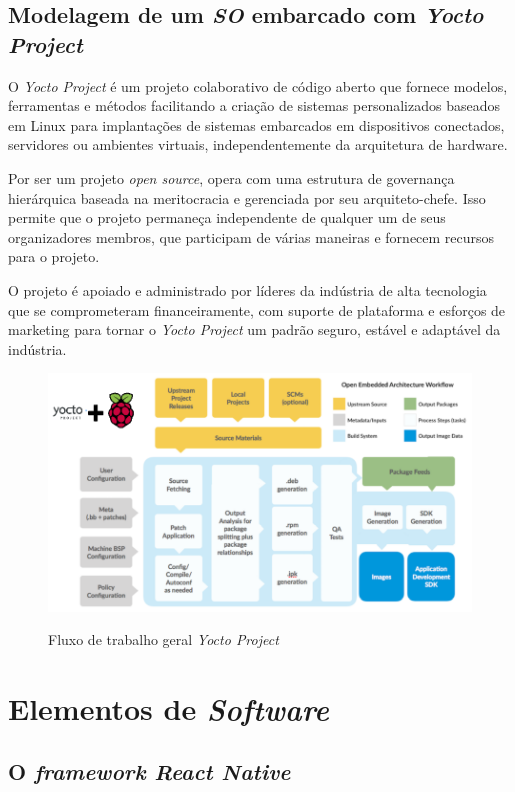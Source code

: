 \subsection{Modelagem de um \textit{SO} embarcado com \textit{Yocto Project}}

O \textit{Yocto Project} é um projeto colaborativo de código aberto que fornece modelos, ferramentas e métodos facilitando a criação de sistemas personalizados baseados em Linux para implantações de sistemas embarcados em dispositivos conectados, servidores ou ambientes virtuais, independentemente da arquitetura de hardware.

Por ser um projeto \textit{open source}, opera com uma estrutura de governança hierárquica baseada na meritocracia e gerenciada por seu arquiteto-chefe. Isso permite que o projeto permaneça independente de qualquer um de seus organizadores membros, que participam de várias maneiras e fornecem recursos para o projeto.

O projeto é apoiado e administrado por líderes da indústria de alta tecnologia que se comprometeram financeiramente, com suporte de plataforma e esforços de marketing para tornar o \textit{Yocto Project} um padrão seguro, estável e adaptável da indústria.

\begin{figure}[H]
	\centering
	\caption{Fluxo de trabalho geral \textit{Yocto Project}}
	\includegraphics[width=1.0\textwidth]{figuras/yocto-fluxo.png}
	\label{fig:youcto-fluxo}
\end{figure} 

\section{Elementos de \textit{Software}}
\subsection{O \textit{framework React Native}}

